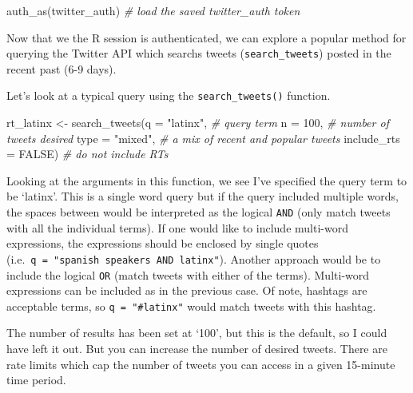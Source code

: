 \documentclass[
]{article}
\newenvironment{Shaded}{\begin{snugshade}}{\end{snugshade}}
\newcommand{\AttributeTok}[1]{\textcolor[rgb]{0.77,0.63,0.00}{#1}}
\newcommand{\CommentTok}[1]{\textcolor[rgb]{0.56,0.35,0.01}{\textit{#1}}}
\newcommand{\ConstantTok}[1]{\textcolor[rgb]{0.00,0.00,0.00}{#1}}
\newcommand{\DecValTok}[1]{\textcolor[rgb]{0.00,0.00,0.81}{#1}}
\newcommand{\FunctionTok}[1]{\textcolor[rgb]{0.00,0.00,0.00}{#1}}
\newcommand{\NormalTok}[1]{#1}
\newcommand{\OtherTok}[1]{\textcolor[rgb]{0.56,0.35,0.01}{#1}}
\newcommand{\StringTok}[1]{\textcolor[rgb]{0.31,0.60,0.02}{#1}}
\begin{document}
\begin{Shaded}
\begin{Highlighting}[]
\FunctionTok{auth\_as}\NormalTok{(twitter\_auth)  }\CommentTok{\# load the saved \textasciigrave{}twitter\_auth\textasciigrave{} token}
\end{Highlighting}
\end{Shaded}

Now that we the R session is authenticated, we can explore a popular method for querying the Twitter API which searchs tweets (\texttt{search\_tweets}) posted in the recent past (6-9 days).

Let's look at a typical query using the \texttt{search\_tweets()} function.

\begin{Shaded}
\begin{Highlighting}[]
\NormalTok{rt\_latinx }\OtherTok{\textless{}{-}} 
  \FunctionTok{search\_tweets}\NormalTok{(}\AttributeTok{q =} \StringTok{"latinx"}\NormalTok{, }\CommentTok{\# query term}
                \AttributeTok{n =} \DecValTok{100}\NormalTok{, }\CommentTok{\# number of tweets desired}
                \AttributeTok{type =} \StringTok{"mixed"}\NormalTok{, }\CommentTok{\# a mix of \textasciigrave{}recent\textasciigrave{} and \textasciigrave{}popular\textasciigrave{} tweets}
                \AttributeTok{include\_rts =} \ConstantTok{FALSE}\NormalTok{) }\CommentTok{\# do not include RTs}
\end{Highlighting}
\end{Shaded}

Looking at the arguments in this function, we see I've specified the query term to be `latinx'. This is a single word query but if the query included multiple words, the spaces between would be interpreted as the logical \texttt{AND} (only match tweets with all the individual terms). If one would like to include multi-word expressions, the expressions should be enclosed by single quotes (i.e.~\texttt{q\ =\ "\textquotesingle{}spanish\ speakers\textquotesingle{}\ AND\ latinx"}). Another approach would be to include the logical \texttt{OR} (match tweets with either of the terms). Multi-word expressions can be included as in the previous case. Of note, hashtags are acceptable terms, so \texttt{q\ =\ "\#latinx"} would match tweets with this hashtag.

The number of results has been set at `100', but this is the default, so I could have left it out. But you can increase the number of desired tweets. There are rate limits which cap the number of tweets you can access in a given 15-minute time period.
\end{document}
